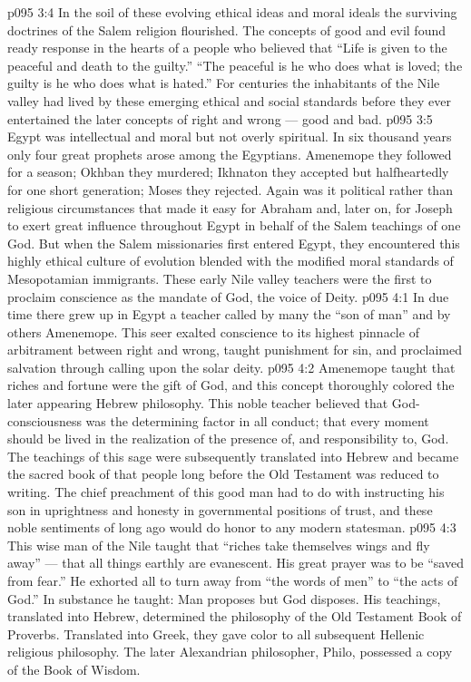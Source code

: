 \vs p095 3:4 In the soil of these evolving ethical ideas and moral ideals the surviving doctrines of the Salem religion flourished. The concepts of good and evil found ready response in the hearts of a people who believed that “Life is given to the peaceful and death to the guilty.” “The peaceful is he who does what is loved; the guilty is he who does what is hated.” For centuries the inhabitants of the Nile valley had lived by these emerging ethical and social standards before they ever entertained the later concepts of right and wrong --- good and bad.
\vs p095 3:5 \pc Egypt was intellectual and moral but not overly spiritual. In six thousand years only four great prophets arose among the Egyptians. Amenemope they followed for a season; Okhban they murdered; Ikhnaton they accepted but halfheartedly for one short generation; Moses they rejected. Again was it political rather than religious circumstances that made it easy for Abraham and, later on, for Joseph to exert great influence throughout Egypt in behalf of the Salem teachings of one God. But when the Salem missionaries first entered Egypt, they encountered this highly ethical culture of evolution blended with the modified moral standards of Mesopotamian immigrants. These early Nile valley teachers were the first to proclaim conscience as the mandate of God, the voice of Deity.
\vs p095 4:1 In due time there grew up in Egypt a teacher called by many the “son of man” and by others Amenemope. This seer exalted conscience to its highest pinnacle of arbitrament between right and wrong, taught punishment for sin, and proclaimed salvation through calling upon the solar deity.
\vs p095 4:2 Amenemope taught that riches and fortune were the gift of God, and this concept thoroughly colored the later appearing Hebrew philosophy. This noble teacher believed that God\hyp{}consciousness was the determining factor in all conduct; that every moment should be lived in the realization of the presence of, and responsibility to, God. The teachings of this sage were subsequently translated into Hebrew and became the sacred book of that people long before the Old Testament was reduced to writing. The chief preachment of this good man had to do with instructing his son in uprightness and honesty in governmental positions of trust, and these noble sentiments of long ago would do honor to any modern statesman.
\vs p095 4:3 This wise man of the Nile taught that “riches take themselves wings and fly away” --- that all things earthly are evanescent. His great prayer was to be “saved from fear.” He exhorted all to turn away from “the words of men” to “the acts of God.” In substance he taught: Man proposes but God disposes. His teachings, translated into Hebrew, determined the philosophy of the Old Testament Book of Proverbs. Translated into Greek, they gave color to all subsequent Hellenic religious philosophy. The later Alexandrian philosopher, Philo, possessed a copy of the Book of Wisdom.
